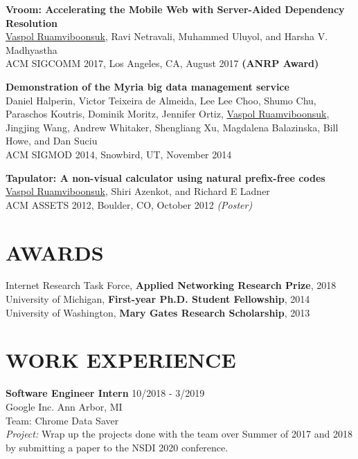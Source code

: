 \documentclass[zhemargin]{res}
\begin{document}
\begin{resume}
    \textbf{Vroom: Accelerating the Mobile Web with Server-Aided Dependency Resolution}\\
    \underline{Vaspol Ruamviboonsuk}, Ravi Netravali, Muhammed Uluyol, and Harsha V. Madhyastha\\
    ACM SIGCOMM 2017, Los Angeles, CA, August 2017 \textbf{(ANRP Award)}

    \textbf{Demonstration of the Myria big data management service}\\
    Daniel Halperin, Victor Teixeira de Almeida, Lee Lee Choo, Shumo Chu, Paraschos Koutris,
    Dominik Moritz, Jennifer Ortiz, \underline{Vaspol Ruamviboonsuk}, Jingjing Wang,
    Andrew Whitaker, Shengliang Xu, Magdalena Balazinska, Bill Howe, and Dan Suciu\\
    ACM SIGMOD 2014, Snowbird, UT, November 2014

    \textbf{Tapulator: A non-visual calculator using natural prefix-free codes}\\
    \underline{Vaspol Ruamviboonsuk}, Shiri Azenkot, and Richard E Ladner\\
    ACM ASSETS 2012, Boulder, CO, October 2012 \textit{(Poster)}

\section{\small AWARDS}
  Internet Research Task Force, \textbf{Applied Networking Research Prize}, 2018 \\
  University of Michigan, \textbf{First-year Ph.D. Student Fellowship}, 2014 \\
  University of Washington, \textbf{Mary Gates Research Scholarship}, 2013 \\

\section{\small WORK EXPERIENCE}
    \textbf{Software Engineer Intern} \hfill 10/2018 - 3/2019 \\
    Google Inc. Ann Arbor, MI\\
    Team: Chrome Data Saver \\
    \emph{Project:} Wrap up the projects done with the team over Summer of 2017
    and 2018 by submitting a paper to the NSDI 2020 conference.


\end{resume}
\end{document}
